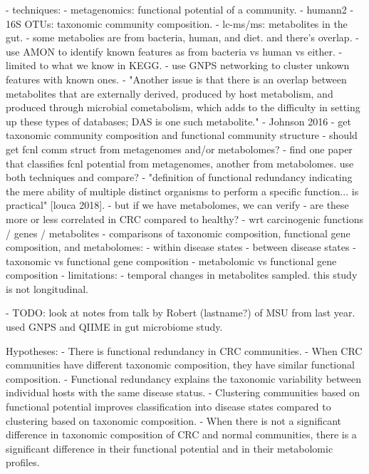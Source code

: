 \documentclass[12pt]{article}
\begin{document}
- techniques:
    - metagenomics: functional potential of a community.
        - humann2
    - 16S OTUs: taxonomic community composition.
    - lc-ms/ms: metabolites in the gut.
        - some metabolies are from bacteria, human, and diet. and there's overlap.
            - use AMON to identify known features as from bacteria vs human vs either.
                - limited to what we know in KEGG.
            - use GNPS networking to cluster unkown features with known ones.
            - "Another issue is that there is an overlap between metabolites that are externally derived, produced by host metabolism, and produced through microbial cometabolism, which adds to the difficulty in setting up these types of databases; DAS is one such metabolite." - Johnson 2016
- get taxonomic community composition and functional community structure
    - should get fcnl comm struct from metagenomes and/or metabolomes?
        - find one paper that classifies fcnl potential from metagenomes, another from metabolomes. use both techniques and compare?
    - "definition of functional redundancy indicating the mere ability of multiple distinct organisms to perform a specific function... is practical" [louca 2018].
        - but if we have metabolomes, we can verify
    - are these more or less correlated in CRC compared to healthy?
        - wrt carcinogenic functions / genes / metabolites
- comparisons of taxonomic composition, functional gene composition, and metabolomes:
    - within disease states
    - between disease states
        - taxonomic vs functional gene composition
        - metabolomic vs functional gene composition
- limitations:
    - temporal changes in metabolites sampled. this study is not longitudinal.

- TODO: look at notes from talk by Robert (lastname?) of MSU from last year. used GNPS and QIIME in gut microbiome study.

Hypotheses:
- There is functional redundancy in CRC communities.
    - When CRC communities have different taxonomic composition, they have similar functional composition.
        - Functional redundancy explains the taxonomic variability between individual hosts with the same disease status.
- Clustering communities based on functional potential improves classification into disease states compared to clustering based on taxonomic composition.
- When there is not a significant difference in taxonomic composition of CRC and normal communities, there is a significant difference in their functional potential and in their metabolomic profiles.
\end{document}

